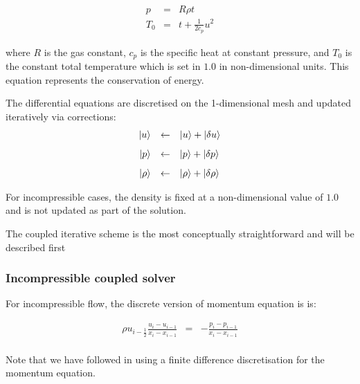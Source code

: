 \begin{equation}
  \begin{array}{rcl}
    p   &=& R\rho t \\[8pt]
    T_0 &=& t + \frac{1}{2c_p}u^2
  \end{array}
  \label{eqn-gaslaw}
\end{equation}

where $R$ is the gas constant, $c_p$ is the specific heat at constant pressure, and
$T_0$ is the constant total temperature which is set in $1.0$ in non-dimensional 
units. This equation represents the conservation of energy. 


The differential equations are discretised on the 1-dimensional mesh and 
updated iteratively via corrections:
\begin{equation}
  \begin{array}{rcl}
     \ket{u}    &\gets& \ket{u}    + \ket{\delta u} \\[8pt]
     \ket{p}    &\gets& \ket{p}    + \ket{\delta p} \\[8pt]
     \ket{\rho} &\gets& \ket{\rho} + \ket{\delta \rho}
  \end{array}
  \label{eqn-iter-update}
\end{equation}

For incompressible cases, the density is fixed at a non-dimensional value of $1.0$ 
and is not updated as part of the solution. 

The coupled iterative scheme is the most conceptually straightforward and will
be described first


\subsubsection{Incompressible coupled solver}
\label{subsubsec-inco-couple}

For incompressible flow, the discrete version of momentum equation is  is:

\begin{equation}
  \begin{array}{rcl}
    \rho u_{i-\frac{1}{2}} \frac{u_i - u_{i-1}}{x_i - x_{i-1}} &=&
                   - \frac{p_i - p_{i-1}}{x_i - x_{i-1}} \\
  \end{array}
  \label{eqn-euler-1d-disc1}
\end{equation}

Note that we have followed \cite{gupta1993development} in using a finite difference
discretisation for the momentum equation.


